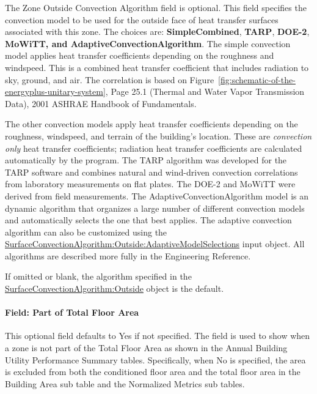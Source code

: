 The Zone Outside Convection Algorithm field is optional. This field specifies the convection model to be used for the outside face of heat transfer surfaces associated with this zone. The choices are: \textbf{SimpleCombined}, \textbf{TARP}, \textbf{DOE-2}, \textbf{MoWiTT, and AdaptiveConvectionAlgorithm}. The simple convection model applies heat transfer coefficients depending on the roughness and windspeed. This is a combined heat transfer coefficient that includes radiation to sky, ground, and air. The correlation is based on Figure~\ref{fig:schematic-of-the-energyplus-unitary-system}, Page 25.1 (Thermal and Water Vapor Transmission Data), 2001 ASHRAE Handbook of Fundamentals.

The other convection models apply heat transfer coefficients depending on the roughness, windspeed, and terrain of the building's location. These are \emph{convection only} heat transfer coefficients; radiation heat transfer coefficients are calculated automatically by the program. The TARP algorithm was developed for the TARP software and combines natural and wind-driven convection correlations from laboratory measurements on flat plates. The DOE-2 and MoWiTT were derived from field measurements. The AdaptiveConvectionAlgorithm model is an dynamic algorithm that organizes a large number of different convection models and automatically selects the one that best applies. The adaptive convection algorithm can also be customized using the \hyperref[surfaceconvectionalgorithmoutsideadaptivemodelselections]{SurfaceConvectionAlgorithm:Outside:AdaptiveModelSelections} input object. All algorithms are described more fully in the Engineering Reference.

If omitted or blank, the algorithm specified in the \hyperref[surfaceconvectionalgorithmoutside]{SurfaceConvectionAlgorithm:Outside} object is the default.

\paragraph{Field: Part of Total Floor Area}\label{field-part-of-total-floor-area}

This optional field defaults to Yes if not specified. The field is used to show when a zone is not part of the Total Floor Area as shown in the Annual Building Utility Performance Summary tables. Specifically, when No is specified, the area is excluded from both the conditioned floor area and the total floor area in the Building Area sub table and the Normalized Metrics sub tables.

